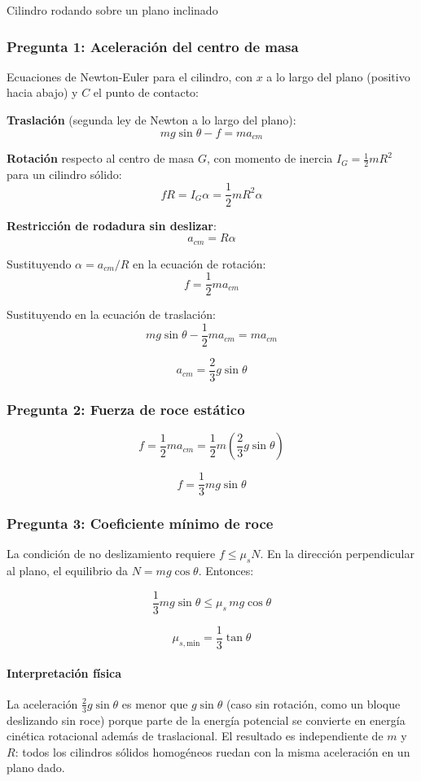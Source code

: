 \begin{solucion}{Cilindro rodando sobre un plano inclinado}
\subsubsection*{Pregunta 1: Aceleración del centro de masa}

Ecuaciones de Newton-Euler para el cilindro, con $x$ a lo largo del plano (positivo hacia abajo) y $C$ el punto de contacto:

\textbf{Traslación} (segunda ley de Newton a lo largo del plano):
$$mg\sin\theta - f = ma_{cm}$$

\textbf{Rotación} respecto al centro de masa $G$, con momento de inercia $I_G = \frac{1}{2}mR^2$ para un cilindro sólido:
$$fR = I_G \alpha = \frac{1}{2}mR^2\alpha$$

\textbf{Restricción de rodadura sin deslizar}:
$$a_{cm} = R\alpha$$

Sustituyendo $\alpha = a_{cm}/R$ en la ecuación de rotación:
$$f = \frac{1}{2}m a_{cm}$$

Sustituyendo en la ecuación de traslación:
$$mg\sin\theta - \frac{1}{2}m a_{cm} = m a_{cm}$$

$$\boxed{a_{cm} = \frac{2}{3}g\sin\theta}$$

\subsubsection*{Pregunta 2: Fuerza de roce estático}

$$f = \frac{1}{2}m a_{cm} = \frac{1}{2}m\left(\frac{2}{3}g\sin\theta\right)$$

$$\boxed{f = \frac{1}{3}mg\sin\theta}$$

\subsubsection*{Pregunta 3: Coeficiente mínimo de roce}

La condición de no deslizamiento requiere $f \leq \mu_s N$. En la dirección perpendicular al plano, el equilibrio da $N = mg\cos\theta$. Entonces:

$$\frac{1}{3}mg\sin\theta \leq \mu_s \, mg\cos\theta$$

$$\boxed{\mu_{s,\text{min}} = \frac{1}{3}\tan\theta}$$

\paragraph{Interpretación física} La aceleración $\frac{2}{3}g\sin\theta$ es menor que $g\sin\theta$ (caso sin rotación, como un bloque deslizando sin roce) porque parte de la energía potencial se convierte en energía cinética rotacional además de traslacional. El resultado es independiente de $m$ y $R$: todos los cilindros sólidos homogéneos ruedan con la misma aceleración en un plano dado.
\end{solucion}
